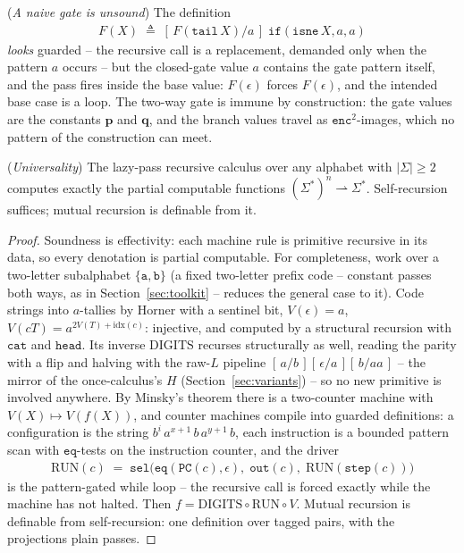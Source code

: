 \documentclass[runningheads,envcountsect]{llncs}
\begin{document}
\begin{example}
    (\emph{A naive gate is unsound})
    \label{ex:naivegate}
    The definition
    \begin{align*}
        F(X) \;\triangleq\; [\,F(\mathtt{tail}\,X)/a\,]\;\mathtt{if}(\mathtt{isne}\,X, a, a)
    \end{align*}
    \emph{looks} guarded -- the recursive call is a replacement, demanded only when the pattern $a$ occurs -- but the closed-gate value $a$ contains the gate pattern itself, and the pass fires inside the base value: $F(\epsilon)$ forces $F(\epsilon)$, and the intended base case is a loop. The two-way gate is immune by construction: the gate values are the constants $\mathbf{p}$ and $\mathbf{q}$, and the branch values travel as $\mathtt{enc}^2$-images, which no pattern of the construction can meet.
\end{example}

\begin{theorem}
    (\emph{Universality})
    \label{thm:universal}
    The lazy-pass recursive calculus over any alphabet with $|\Sigma| \geq 2$ computes exactly the partial computable functions $(\Sigma^*)^n \rightharpoonup \Sigma^*$. Self-recursion suffices; mutual recursion is definable from it.
\end{theorem}

\begin{proof}
    Soundness is effectivity: each machine rule is primitive recursive in its data, so every denotation is partial computable. For completeness, work over a two-letter subalphabet $\{\mathtt{a}, \mathtt{b}\}$ (a fixed two-letter prefix code -- constant passes both ways, as in Section~\ref{sec:toolkit} -- reduces the general case to it). Code strings into $a$-tallies by Horner with a sentinel bit, $V(\epsilon) = a$, $V(cT) = a^{2V(T) + \mathrm{idx}(c)}$: injective, and computed by a structural recursion with $\mathtt{cat}$ and $\mathtt{head}$. Its inverse $\mathrm{DIGITS}$ recurses structurally as well, reading the parity with a flip and halving with the raw-$L$ pipeline $[\,a/b\,][\,\epsilon/a\,][\,b/aa\,]$ -- the mirror of the once-calculus's $H$ (Section~\ref{sec:variants}) -- so no new primitive is involved anywhere. By Minsky's theorem \cite{minsky67} there is a two-counter machine with $V(X) \mapsto V(f(X))$, and counter machines compile into guarded definitions: a configuration is the string $b^i\,a^{x+1}\,b\,a^{y+1}\,b$, each instruction is a bounded pattern scan with $\mathtt{eq}$-tests on the instruction counter, and the driver
    \begin{align}
        \mathrm{RUN}(c) \;=\; \mathtt{sel}\big(\mathtt{eq}(\mathtt{PC}(c), \epsilon),\; \mathtt{out}(c),\; \mathrm{RUN}(\mathtt{step}(c))\big)
    \end{align}
    is the pattern-gated while loop -- the recursive call is forced exactly while the machine has not halted. Then $f = \mathrm{DIGITS} \circ \mathrm{RUN} \circ V$. Mutual recursion is definable from self-recursion: one definition over tagged pairs, with the projections plain passes.
\end{proof}
\end{document}
